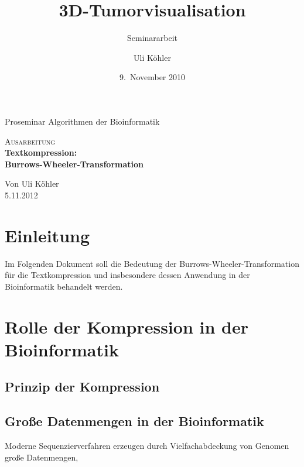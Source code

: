 \documentclass[ngerman,pdftex,paper=A4,DIV=calc,titlepage,12pt]{scrartcl}
\title{3D-Tumorvisualisation}
\subtitle{Seminararbeit}
\author{Uli Köhler}
\date{9.~November 2010}
\newtheorem[L]{boxedDefinition}{Definition}
\begin{document}
\begin{titlepage}
\begin{center}
 Proseminar \glqq Algorithmen der Bioinformatik\grqq
 \end{center}
\vspace{4cm}
\begin{center}
  
 \large\textsc{Ausarbeitung}\\[5mm]
 {\Huge\centering\bfseries\selectfont Textkompression:\\Burrows-Wheeler-Transformation}\\[2cm]
\begin{center}
  Von Uli Köhler\\
  5.11.2012
\end{center}
\vspace{2cm}
\end{center}
\end{titlepage}
\thispagestyle{empty}\newpage %
\tableofcontents\thispagestyle{empty}\newpage 
\section{Einleitung}
Im Folgenden Dokument soll die Bedeutung der Burrows-Wheeler-Transformation für die Textkompression und insbesondere dessen Anwendung in der Bioinformatik behandelt werden.
\section{Rolle der Kompression in der Bioinformatik}
\subsection{Prinzip der Kompression}
\subsection{Große Datenmengen in der Bioinformatik}
Moderne Sequenzierverfahren erzeugen durch Vielfachabdeckung von Genomen große Datenmengen,
\renewcommand\refname{Literatur- und Quellenverzeichnis}


\end{document}
